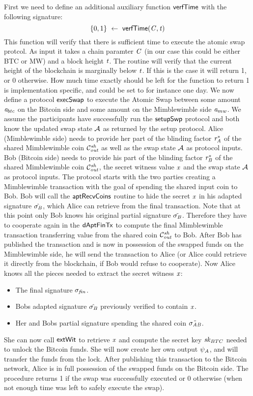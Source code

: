 First we need to define an additional auxiliary function $\mathsf{verfTime}$ with the following signature:
\[ \{0,1\} ~\leftarrow~ \mathsf{verfTime} (\mathit{C},\mathit{t}) \]
This function will verify that there is sufficient time to execute the atomic swap protcol.
As input it takes a chain paramter $\mathit{C}$ (in our case this could be either BTC or MW) and a block height $\mathit{t}$.
The routine will verify that the current height of the blockchain is marginally below $\mathit{t}$.
If this is the case it will return 1, or 0 otherwise.
How much time exactly should be left for the function to return 1 is implementation specific, and could be set to for instance one day.
We now define a protocol $\mathsf{execSwap}$ to execute the Atomic Swap between some amount $\mathit{a}_{btc}$ on the Bitcoin side and some amount on the Mimblewimble side $\mathit{a}_{mw}$.
We assume the participants have successfully run the $\mathsf{setupSwp}$ protocol and both know the updated swap state $\mathcal{A}$ as returned by the setup protocol.
Alice (Mimblewimble side) needs to provide her part of the blinding factor $\mathit{r}_{\mathit{A}}^*$ of the shared Mimblewimble coin $\mathcal{C}_{\mathit{out}}^{\mathit{sh}}$ as well as the swap state $\mathcal{A}$ as protocol inputs.
Bob (Bitcoin side) needs to provide his part of the blinding factor $\mathit{r}_{\mathit{B}}^*$ of the shared Mimblewimble coin $\mathcal{C}_{\mathit{out}}^{\mathit{sh}}$, the secret witness value $\mathit{x}$ and the swap state $\mathcal{A}$ as protocol inputs.
The protocol starts with the two parties creating a Mimblewimble transaction with the goal of spending the shared input coin to Bob.
Bob will call the $\mathsf{aptRecvCoins}$ routine to hide the secret $\mathit{x}$ in his adapted signature $\hat{\sigma_{\mathit{B}}}$, which Alice can retrieve from the final transaction.
Note that at this point only Bob knows his original partial signature $\tilde{\sigma_{\mathit{B}}}$.
Therefore they have to cooperate again in the $\mathsf{dAptFinTx}$ to compute the final Mimblewimble transaction transferring value from the shared coin $\mathcal{C}_{\mathit{out}}^{\mathit{sh}}$ to Bob.
After Bob has published the transaction and is now in possession of the swapped funds on the Mimblewimble side, he will send the transaction to Alice (or Alice could retrieve it directly from the blockchain, if Bob would refuse to cooperate).
Now Alice knows all the pieces needed to extract the secret witness $\mathit{x}$:
\begin{itemize}
    \item The final signature $\sigma_{\mathit{fin}}$.
    \item Bobs adapted signature $\hat{\sigma_{\mathit{B}}}$ previously verified to contain $\mathit{x}$.
    \item Her and Bobs partial signature spending the shared coin $\tilde{\sigma_{\mathit{A}\mathit{B}}}$.
\end{itemize}
She can now call $\mathsf{extWit}$ to retrieve $\mathit{x}$ and compute the secret key $\mathit{sk}_{BTC}$ needed to unlock the Bitcoin funds.
She will now create her own output $\psi_{\mathit{A}}$, and will transfer the funds from the lock.
After publishing this transaction to the Bitcoin network, Alice is in full possession of the swapped funds on the Bitcoin side.
The procedure returns 1 if the swap was successfully executed or 0 otherwise (when not enough time was left to safely execute the swap).

